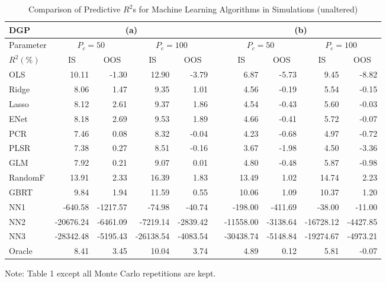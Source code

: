 \documentclass[]{article}
\begin{document}
\begin{table}[ht]
\begin{threeparttable}
\centering
\setlength{\tabcolsep}{6pt}
\caption{Comparison of Predictive $R^2$s for Machine Learning Algorithms in Simulations (unaltered)}
\begin{tabular}{lrrrrcrrrr}
DGP & \multicolumn{4}{c}{(a)} && \multicolumn{4}{c}{(b)} \\
\hline\noalign{\smallskip}
Parameter & \multicolumn{2}{c}{$P_c = 50$} & \multicolumn{2}{c}{$P_c = 100$}& & \multicolumn{2}{c}{$P_c = 50$} &  \multicolumn{2}{c}{$P_c = 100$} \\
  \noalign{\smallskip}\hline\noalign{\smallskip}
$R^2(\%)$ & \multicolumn{1}{c}{IS} & \multicolumn{1}{c}{OOS} & \multicolumn{1}{c}{IS} & \multicolumn{1}{c}{OOS} & &\multicolumn{1}{c}{IS} & \multicolumn{1}{c}{OOS} & \multicolumn{1}{c}{IS} & \multicolumn{1}{c}{OOS} \\ 
  \noalign{\smallskip}\hline\noalign{\smallskip}
OLS & 10.11 & -1.30 & 12.90 & -3.79 && 6.87 & -5.73 & 9.45 & -8.82 \\ 
Ridge & 8.06 & 1.47 & 9.35 & 1.01 && 4.56 & -0.19 & 5.54 & -0.15 \\ 
Lasso & 8.12 & 2.61 & 9.37 & 1.86 && 4.54 & -0.43 & 5.60 & -0.03 \\ 
ENet & 8.18 & 2.69 & 9.53 & 1.89 && 4.66 & -0.41 & 5.72 & -0.07 \\ 
PCR & 7.46 & 0.08 & 8.32 & -0.04 && 4.23 & -0.68 & 4.97 & -0.72 \\ 
PLSR & 7.38 & 0.27 & 8.51 & -0.16 && 3.67 & -1.98 & 4.50 & -3.36 \\ 
GLM & 7.92 & 0.21 & 9.07 & 0.01 && 4.80 & -0.48 & 5.87 & -0.98 \\ 
RandomF & 13.91 & 2.33 & 16.39 & 1.83 && 13.49 & 1.02 & 14.74 & 2.23 \\ 
GBRT & 9.84 & 1.94 & 11.59 & 0.55 && 10.06 & 1.09 & 10.37 & 1.20 \\ 
NN1 & -640.58 & -1217.57 & -74.98 & -40.74 && -198.00 & -411.69 & -38.00 & -11.00 \\ 
NN2 & -20676.24 & -6461.09 & -7219.14 & -2839.42 && -11558.00 & -3138.64 & -16728.12 & -4427.85 \\ 
NN3 & -28342.48 & -5195.43 & -26138.54 & -4083.54 && -30438.74 & -5148.84 & -19274.67 & -4973.21 \\ 
Oracle & 8.41 & 3.45 & 10.04 & 3.74 && 4.89 & 0.12 & 5.81 & -0.07 \\ 
   \hline
\end{tabular}
\begin{tablenotes}
      \small
      \item Note: Table 1 except all Monte Carlo repetitions are kept.
    \end{tablenotes}
  \end{threeparttable}
\end{table}
\end{document}
